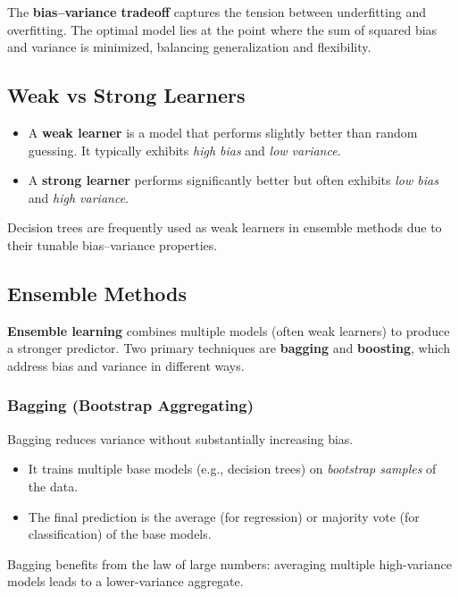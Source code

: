 \documentclass[9pt]{extarticle}
\begin{document}
The \textbf{bias–variance tradeoff} captures the tension between underfitting and overfitting. The optimal model lies at the point where the sum of squared bias and variance is minimized, balancing generalization and flexibility.

\subsection{Weak vs Strong Learners}

\begin{itemize}
    \item A \textbf{weak learner} is a model that performs slightly better than random guessing. It typically exhibits \textit{high bias} and \textit{low variance}.
    \item A \textbf{strong learner} performs significantly better but often exhibits \textit{low bias} and \textit{high variance}.
\end{itemize}

Decision trees are frequently used as weak learners in ensemble methods due to their tunable bias–variance properties.

\subsection{Ensemble Methods}

\textbf{Ensemble learning} combines multiple models (often weak learners) to produce a stronger predictor. Two primary techniques are \textbf{bagging} and \textbf{boosting}, which address bias and variance in different ways.

\subsubsection{Bagging (Bootstrap Aggregating)}

Bagging reduces variance without substantially increasing bias.

\begin{itemize}
    \item It trains multiple base models (e.g., decision trees) on \textit{bootstrap samples} of the data.
    \item The final prediction is the average (for regression) or majority vote (for classification) of the base models.
\end{itemize}

Bagging benefits from the law of large numbers: averaging multiple high-variance models leads to a lower-variance aggregate.
\end{document}
